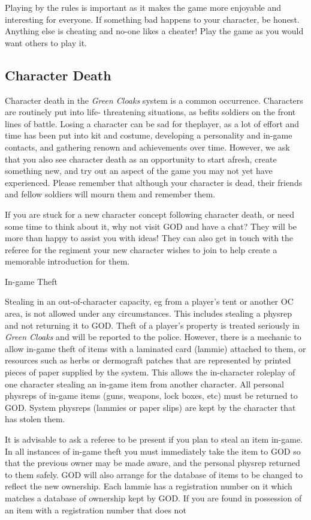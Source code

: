 \documentclass{scrbook}
\begin{document}
Playing by the rules is important as it makes the game more enjoyable and interesting for everyone. If something bad happens to your character, be honest. Anything else is cheating and no-one likes a cheater! Play the game as you would want others to play it.

\subsection{Character Death}

Character death in the \textit{Green Cloaks} system is a common occurrence. Characters are routinely put into life- threatening situations, as befits soldiers on the front lines of battle. Losing a character can be sad for theplayer, as a lot of effort and time has been put into kit and costume, developing a personality and in-game contacts, and gathering renown and achievements over time. However, we ask that you also see character death as an opportunity to start afresh, create something new, and try out an aspect of the game you may not yet have experienced. Please remember that although your character is dead, their friends and fellow soldiers will mourn them and remember them.

If you are stuck for a new character concept following character death, or need some time to think about it, why not visit GOD and have a chat? They will be more than happy to assist you with ideas! They can also get in touch with the referee for the regiment your new character wishes to join to help create a memorable introduction for them.

In-game Theft

Stealing in an out-of-character capacity, eg from a player's tent or another OC area, is not allowed under any circumstances. This includes stealing a physrep and not returning it to GOD. Theft of a player's property is treated seriously in \textit{Green Cloaks} and will be reported to the police. However, there is a mechanic to allow in-game theft of items with a laminated card (lammie) attached to them, or resources such as herbs or dermograft patches that are represented by printed pieces of paper supplied by the system. This allows the in-character roleplay of one character stealing an in-game item from another character. All personal physreps of in-game items (guns, weapons, lock boxes, etc) must be returned to GOD. System physreps (lammies or paper slips) are kept by the character that has stolen them.

It is advisable to ask a referee to be present if you plan to steal an item in-game. In all instances of in-game theft you must immediately take the item to GOD so that the previous owner may be made aware, and the personal physrep returned to them safely. GOD will also arrange for the database of items to be changed to reflect the new ownership. Each lammie has a registration number on it which matches a database of ownership kept by GOD. If you are found in possession of an item with a registration number that does not
\end{document}
